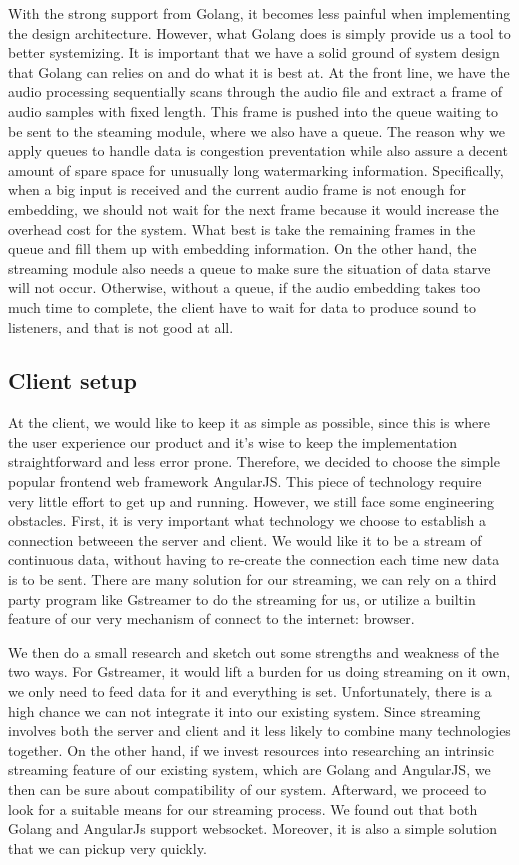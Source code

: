 With the strong support from Golang, it becomes less painful when implementing the design architecture. However, what Golang does is simply provide us a tool to better systemizing. It is important that we have a solid ground of system design that Golang can relies on and do what it is best at. At the front line, we have the audio processing sequentially scans through the audio file and extract a frame of audio samples with fixed length. This frame is pushed into the queue waiting to be sent to the steaming module, where we also have a queue. The reason why we apply queues to handle data is congestion preventation while also assure a decent amount of spare space for unusually long watermarking information. Specifically, when a big input is received and the current audio frame is not enough for embedding, we should not wait for the next frame because it would increase the overhead cost for the system. What best is take the remaining frames in the queue and fill them up with embedding information. On the other hand, the streaming module also needs a queue to make sure the situation of data starve will not occur. Otherwise, without a queue, if the audio embedding takes too much time to complete, the client have to wait for data to produce sound to listeners, and that is not good at all.

\subsection{Client setup}
At the client, we would like to keep it as simple as possible, since this is where the user experience our product and it's wise to keep the implementation straightforward and less error prone. Therefore, we decided to choose the simple popular frontend web framework AngularJS\cite{angular}. This piece of technology require very little effort to get up and running. However, we still face some engineering obstacles. First, it is very important what technology we choose to establish a connection betweeen the server and client. We would like it to be a stream of continuous data, without having to re-create the connection each time new data is to be sent. There are many solution for our streaming, we can rely on a third party program like Gstreamer\cite{gstreamer} to do the streaming for us, or utilize a builtin feature of our very mechanism of connect to the internet: browser. 

We then do a small research and sketch out some strengths and weakness of the two ways. For Gstreamer, it would lift a burden for us doing streaming on it own, we only need to feed data for it and everything is set. Unfortunately, there is a high chance we can not integrate it into our existing system. Since streaming involves both the server and client and it less likely to combine many technologies together. On the other hand, if we invest resources into researching an intrinsic streaming feature of our existing system, which are Golang and AngularJS, we then can be sure about compatibility of our system. Afterward, we proceed to look for a suitable means for our streaming process. We found out that both Golang and AngularJs support websocket. Moreover, it is also a simple solution that we can pickup very quickly.

